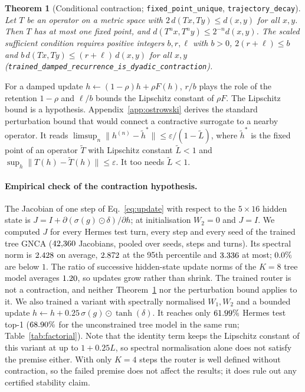 \documentclass[10pt,twocolumn,letterpaper]{article}
\newtheorem{theorem}{Theorem}
\begin{document}
\begin{theorem}[Conditional contraction; \texttt{fixed\_\allowbreak{}point\_\allowbreak{}unique}, \texttt{trajectory\_\allowbreak{}decay}]\label{thm:contraction}
Let $T$ be an operator on a metric space with $2\,d(T x, T y) \le d(x,y)$ for all $x,y$. Then $T$ has at most one fixed point, and $d(T^n x, T^n y) \le 2^{-n} d(x,y)$. The scaled sufficient condition requires positive integers $b,r,\ell$ with $b>0$, $2(r+\ell)\le b$ and $b\,d(Tx,Ty)\le(r+\ell)\,d(x,y)$ for all $x,y$ (\texttt{trained\_\allowbreak{}damped\_\allowbreak{}recurrence\_\allowbreak{}is\_\allowbreak{}dyadic\_\allowbreak{}contraction}).
\end{theorem}
For a damped update $h\leftarrow(1-\rho)h+\rho F(h)$, $r/b$ plays the role of the retention $1-\rho$ and $\ell/b$ bounds the Lipschitz constant of $\rho F$. The Lipschitz bound is a hypothesis. Appendix~\ref{app:ostrowski} derives the standard perturbation bound that would connect a contractive surrogate to a nearby operator. It reads $\limsup_n\|h^{(n)}-\tilde h^\ast\| \le \varepsilon/(1-\tilde L)$, where $\tilde h^\ast$ is the fixed point of an operator $\tilde T$ with Lipschitz constant $\tilde L<1$ and $\sup_h\|T(h)-\tilde T(h)\|\le\varepsilon$. It too needs $\tilde L<1$.

\paragraph{Empirical check of the contraction hypothesis.} The Jacobian of one step of Eq.~\eqref{eq:update} with respect to the $5\times16$ hidden state is $J = I + \partial(\sigma(g)\odot\delta)/\partial h$; at initialisation $W_2=0$ and $J=I$. We computed $J$ for every Hermes test turn, every step and every seed of the trained tree GNCA ($42{,}360$ Jacobians, pooled over seeds, steps and turns). Its spectral norm is $2.428$ on average, $2.872$ at the 95th percentile and $3.336$ at most; $0.0\%$ are below $1$. The ratio of successive hidden-state update norms of the $K{=}8$ tree model averages $1.20$, so updates grow rather than shrink. The trained router is not a contraction, and neither Theorem~\ref{thm:contraction} nor the perturbation bound applies to it. We also trained a variant with spectrally normalised $W_1,W_2$ and a bounded update $h \leftarrow h + 0.25\,\sigma(g)\odot\tanh(\delta)$. It reaches only $61.99\%$ Hermes test top-1 ($68.90\%$ for the unconstrained tree model in the same run; Table~\ref{tab:factorial}). Note that the identity term keeps the Lipschitz constant of this variant at up to $1+0.25L$, so spectral normalisation alone does not satisfy the premise either. With only $K{=}4$ steps the router is well defined without contraction, so the failed premise does not affect the results; it does rule out any certified stability claim.
\end{document}
